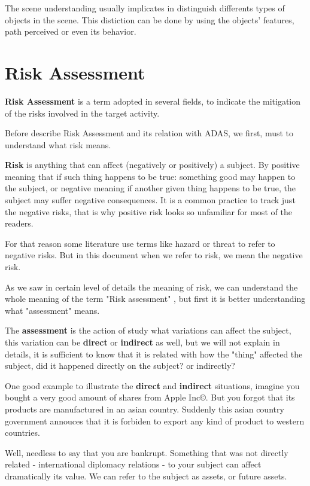 The scene understanding usually implicates in distinguish differents types of objects in the scene. This distiction can be done by using the objects' features, path perceived or even its behavior. 


\section{Risk Assessment}

\textbf{Risk Assessment} is a term adopted in several fields, to indicate the mitigation of the risks involved in the target activity. 

Before describe Risk Assessment and its relation with ADAS, we first, must to understand what risk means.

\textbf{Risk} is anything that can affect (negatively or positively) a subject. By positive meaning that if such thing happens to be true: something good may happen to the subject, or negative meaning if another given thing happens to be true, the subject may suffer negative consequences. It is a common practice to track just the negative risks, that is why positive risk looks so unfamiliar for most of the readers. 

For that reason some literature use terms like hazard or threat to refer to negative risks. But in this document when we refer to risk, we mean the negative risk.

As we saw in certain level of details the meaning of risk, we can understand the whole meaning of the term "Risk assessment" , but first it is better understanding what "assessment" means.

The \textbf{assessment} is the action of study what variations can affect the subject, this variation can be \textbf{direct} or \textbf{indirect} as well, but we will not explain in details, it is sufficient to know that it is related with how the "thing" affected the subject, did it happened directly on the subject? or indirectly?

One good example to illustrate the \textbf{direct} and \textbf{indirect} situations, imagine you bought a very good amount of shares from Apple Inc\copyright. But you forgot that its products are manufactured in an asian country. Suddenly this asian country government annouces that it is forbiden to export any kind of product to western countries. 

Well, needless to say that you are bankrupt. Something that was not directly related - international diplomacy relations - to your subject can affect dramatically its value. We can refer to the subject as assets, or future assets.

